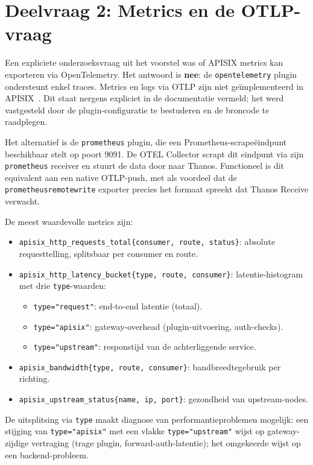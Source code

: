 \section{Deelvraag 2: Metrics en de OTLP-vraag}%
\label{sec:bevinding-metrics}

Een expliciete onderzoeksvraag uit het voorstel was of APISIX metrics kan exporteren via OpenTelemetry. Het antwoord is \textbf{nee}: de \texttt{opentelemetry} plugin ondersteunt enkel traces. Metrics en logs via OTLP zijn niet geïmplementeerd in APISIX~\autocite{APISIXOTelPlugin2024}. Dit staat nergens expliciet in de documentatie vermeld; het werd vastgesteld door de plugin-configuratie te bestuderen en de broncode te raadplegen.

Het alternatief is de \texttt{prometheus} plugin, die een Prometheus-scrapeëindpunt beschikbaar stelt op poort 9091. De OTEL Collector scrapt dit eindpunt via zijn \texttt{prometheus} receiver en stuurt de data door naar Thanos. Functioneel is dit equivalent aan een native OTLP-push, met als voordeel dat de \texttt{prometheusremotewrite} exporter precies het formaat spreekt dat Thanos Receive verwacht.

De meest waardevolle metrics zijn:

\begin{itemize}
  \item \texttt{apisix\_http\_requests\_total\{consumer, route, status\}}: absolute requesttelling, splitsbaar per consumer en route.
  \item \texttt{apisix\_http\_latency\_bucket\{type, route, consumer\}}: latentie-histogram met drie \texttt{type}-waarden:
    \begin{itemize}
      \item \texttt{type="request"}: end-to-end latentie (totaal).
      \item \texttt{type="apisix"}: gateway-overhead (plugin-uitvoering, auth-checks).
      \item \texttt{type="upstream"}: responstijd van de achterliggende service.
    \end{itemize}
  \item \texttt{apisix\_bandwidth\{type, route, consumer\}}: bandbreedtegebruik per richting.
  \item \texttt{apisix\_upstream\_status\{name, ip, port\}}: gezondheid van upstream-nodes.
\end{itemize}

De uitsplitsing via \texttt{type} maakt diagnose van performantieproblemen mogelijk: een stijging van \texttt{type="apisix"} met een vlakke \texttt{type="upstream"} wijst op gateway-zijdige vertraging (trage plugin, forward-auth-latentie); het omgekeerde wijst op een backend-probleem.

